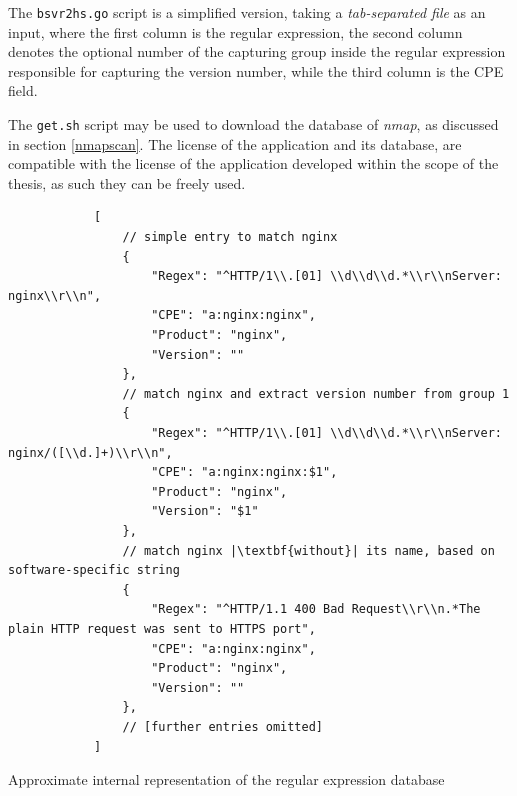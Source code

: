\documentclass[a4paper,12pt]{article}
\begin{document}
	The \texttt{bsvr2hs.go} script is a simplified version, taking a \textit{tab-separated file} as an input, where the first column is the regular expression, the second column denotes the optional number of the capturing group inside the regular expression responsible for capturing the version number, while the third column is the CPE field.
	
	The \texttt{get.sh} script may be used to download the database of \textit{nmap}, as discussed in section \ref{nmapscan}. The license of the application and its database, are compatible with the license of the application developed within the scope of the thesis, as such they can be freely used.
	
	\begin{listing}[H]
		\begin{verbatim}
			[
				// simple entry to match nginx
				{
					"Regex": "^HTTP/1\\.[01] \\d\\d\\d.*\\r\\nServer: nginx\\r\\n",
					"CPE": "a:nginx:nginx",
					"Product": "nginx",
					"Version": ""
				},
				// match nginx and extract version number from group 1
				{
					"Regex": "^HTTP/1\\.[01] \\d\\d\\d.*\\r\\nServer: nginx/([\\d.]+)\\r\\n",
					"CPE": "a:nginx:nginx:$1",
					"Product": "nginx",
					"Version": "$1"
				},
				// match nginx |\textbf{without}| its name, based on software-specific string
				{
					"Regex": "^HTTP/1.1 400 Bad Request\\r\\n.*The plain HTTP request was sent to HTTPS port",
					"CPE": "a:nginx:nginx",
					"Product": "nginx",
					"Version": ""
				},
				// [further entries omitted]
			]
		\end{verbatim}
		\caption{Approximate internal representation of the regular expression database}
		\label{jsrgxdb}
	\end{listing}
\end{document}
